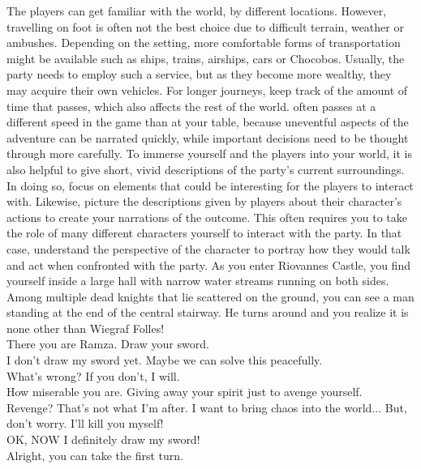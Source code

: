 %
\ofpar
%
The players can get familiar with the world, by  different locations.
However, travelling on foot is often not the best choice due to difficult terrain, weather or ambushes.
Depending on the setting, more comfortable forms of transportation might be available such as ships, trains, airships, cars or Chocobos.
Usually, the party needs to employ such a service, but as they become more wealthy, they may acquire their own vehicles.
For longer journeys, keep track of the amount of time that passes, which also affects the rest of the world.
 often passes at a different speed in the game than at your table, because uneventful aspects of the adventure can be narrated quickly, while important decisions need to be thought through more carefully.
To immerse yourself and the players into your world, it is also helpful to give short, vivid descriptions of the party's current surroundings.
In doing so, focus on elements that could be interesting for the players to interact with.
Likewise, picture the descriptions given by players about their character's actions to create your narrations of the outcome.
This often requires you to take the role of many different characters yourself to interact with the party.
In that case, understand the perspective of the character to portray how they would talk and act when confronted with the party.
%
\ofpar
%
{
	As you enter Riovannes Castle, you find yourself inside a large hall with narrow water streams running on both sides.
	Among multiple dead knights that lie scattered on the ground, you can see a man standing at the end of the central stairway.
	He turns around and you realize it is none other than Wiegraf Folles! \vspace{0.25cm}\\
	 There you are Ramza. Draw your sword. \vspace{0.25cm}\\			
	 I don't draw my sword yet. Maybe we can solve this peacefully. \vspace{0.25cm}\\	
	 What's wrong? If you don't, I will. \vspace{0.25cm}\\			
	 How miserable you are. Giving away your spirit just to avenge yourself. \vspace{0.25cm}\\
	 Revenge? That's not what I'm after.
	I want to bring chaos into the world... But, don't worry. I'll kill you myself! \vspace{0.25cm}\\			
	 OK, NOW I definitely draw my sword! \vspace{0.25cm}\\
	 Alright, you can take the first turn.
}
